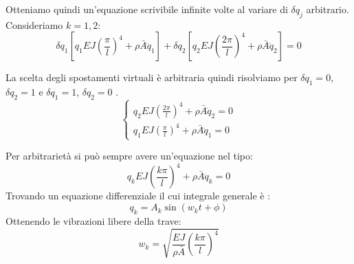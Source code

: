 Otteniamo quindi un'equazione scrivibile infinite volte al variare di $\delta q_j$ arbitrario. Consideriamo $k=1,2$:
\begin{equation*}
    \delta q_1  \left[q_1 EJ        \left(\frac{\pi}{l}\right)^4    +\rho \bar{A}\ddot{q}_1\right] + 
    \delta q_2  \left[q_2 EJ        \left(\frac{2\pi}{l}\right)^4    +\rho \bar{A}\ddot{q}_2\right] =0
\end{equation*}

La scelta degli spostamenti virtuali è arbitraria quindi risolviamo per $\delta q_1=0$, $\delta q_2=1$  e $\delta q_1=1$, $\delta q_2=0$ .
\begin{equation*}
    \begin{cases}
         q_2 EJ        \left(\frac{2\pi}{l}\right)^4    +\rho \bar{A}\ddot{q}_2=0\\
         q_1 EJ        \left(\frac{\pi}{l}\right)^4    +\rho \bar{A}\ddot{q}_1=0
    \end{cases}
\end{equation*}

Per arbitrarietà si può sempre avere un'equazione nel tipo:
\begin{equation*}
    q_k EJ        \left(\frac{k\pi}{l}\right)^4    +\rho \bar{A}\ddot{q}_k=0
\end{equation*}
Trovando un equazione differenziale il cui integrale generale è :
\begin{equation*}
    q_k = A_k \sin{\left(  w_kt+\phi      \right)}
\end{equation*}
Ottenendo le vibrazioni libere della trave:
\begin{equation*}
    w_k= \sqrt{\frac{EJ}{\rho \bar{A}}   \left(\frac{k\pi}{l}\right)^4  }
\end{equation*}
